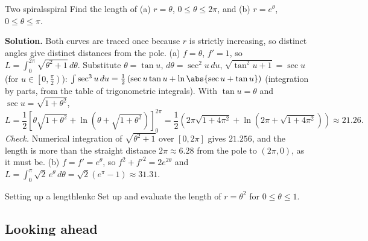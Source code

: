 \documentclass[11pt]{article}
\begin{document}
\begin{exmp}{Two spirals}{spiral}
Find the length of (a) $r=\theta$, $0\le\theta\le2\pi$, and (b) $r=e^\theta$, $0\le\theta\le\pi$.

\textbf{Solution.} Both curves are traced once because $r$ is strictly increasing, so distinct angles give distinct distances from the pole. (a) $f=\theta$, $f'=1$, so $L=\int_0^{2\pi}\sqrt{\theta^2+1}\,d\theta$. Substitute $\theta=\tan u$, $d\theta=\sec^2u\,du$, $\sqrt{\tan^2u+1}=\sec u$ (for $u\in\left[0,\frac\pi2\right)$): $\int\sec^3u\,du=\frac12\left(\sec u\tan u+\ln\abs{\sec u+\tan u}\right)$ (integration by parts, from the table of trigonometric integrals). With $\tan u=\theta$ and $\sec u=\sqrt{1+\theta^2}$,
\[L=\frac12\left[\theta\sqrt{1+\theta^2}+\ln\left(\theta+\sqrt{1+\theta^2}\right)\right]_0^{2\pi}=\frac12\left(2\pi\sqrt{1+4\pi^2}+\ln\left(2\pi+\sqrt{1+4\pi^2}\right)\right)\approx21.26.\]
\emph{Check.} Numerical integration of $\sqrt{\theta^2+1}$ over $[0,2\pi]$ gives $21.256$, and the length is more than the straight distance $2\pi\approx6.28$ from the pole to $(2\pi,0)$, as it must be. (b) $f=f'=e^\theta$, so $f^2+f'^2=2e^{2\theta}$ and $L=\int_0^\pi\sqrt2\,e^\theta\,d\theta=\sqrt2\left(e^\pi-1\right)\approx31.31$.
\end{exmp}

\begin{kc}{Setting up a length}{lenkc}
Set up and evaluate the length of $r=\theta^2$ for $0\le\theta\le1$.
\end{kc}


\subsection*{Looking ahead}
\end{document}
